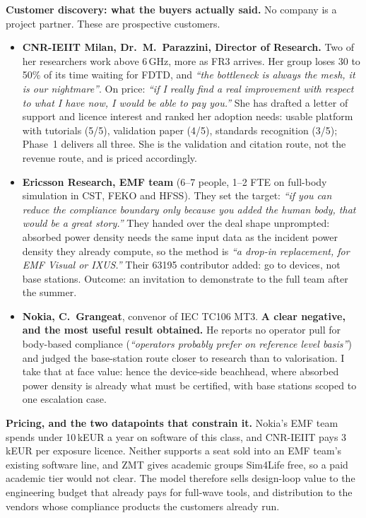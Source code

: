 \documentclass[10pt,a4paper]{article}
\begin{document}
\textbf{Customer discovery: what the buyers actually said.} No company is a project partner. These are prospective customers.
\begin{itemize}
  \item \textbf{CNR-IEIIT Milan, Dr.~M.~Parazzini, Director of Research.} Two of her researchers work above 6\,GHz, more as FR3
    arrives. Her group loses 30 to 50\% of its time waiting for FDTD, and \textit{``the bottleneck is
    always the mesh, it is our nightmare''}. On price: \textit{``if I really find a real improvement with respect to what I have
    now, I would be able to pay you.''} She has drafted a letter of support and licence interest and ranked her adoption needs: usable
    platform with tutorials (5/5), validation paper (4/5), standards recognition (3/5); Phase~1 delivers all three. She is the
    validation and citation route, not the revenue route, and is priced accordingly.
  \item \textbf{Ericsson Research, EMF team} (6--7 people, 1--2 FTE on full-body simulation in CST, FEKO and HFSS). They set the
    target: \textit{``if you can reduce the compliance boundary only because you added the human body, that would be a great
    story.''} They handed over the deal shape unprompted: absorbed power density needs the same input data as the
    incident power density they already compute, so the method is \textit{``a drop-in replacement, for EMF Visual or IXUS.''} Their 63195 contributor added: go to devices, not base stations. Outcome:
    an invitation to demonstrate to the full team after the summer.
  \item \textbf{Nokia, C.~Grangeat}, convenor of IEC TC106 MT3. \textbf{A clear negative, and the most useful result obtained.} He
    reports no operator pull for body-based compliance (\textit{``operators probably prefer on reference level basis''}) and judged
    the base-station route closer to research than to valorisation. I take that at face value: hence the device-side
    beachhead, where absorbed power density is already what must be certified, with base stations scoped to one escalation case.
\end{itemize}

\textbf{Pricing, and the two datapoints that constrain it.} Nokia's EMF team spends under 10\,kEUR a year on software of this
class, and CNR-IEIIT pays 3\,kEUR per exposure licence. Neither supports a seat sold into an EMF team's existing software line,
and ZMT gives academic groups Sim4Life free, so a paid academic tier would not clear.
The model therefore sells design-loop value to the engineering budget that already pays for full-wave tools, and
distribution to the vendors whose compliance products the customers already run.
\end{document}
